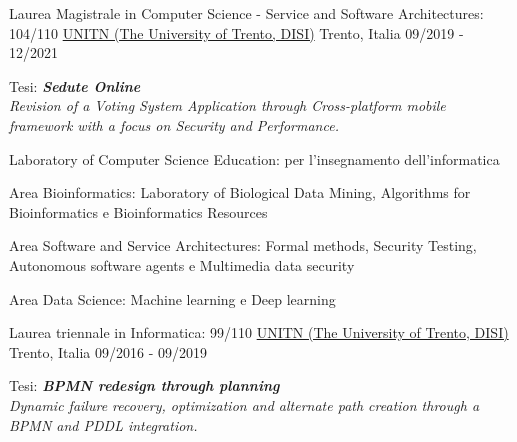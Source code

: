 

\begin{cventries}

\cventry
{Laurea Magistrale in Computer Science - Service and Software Architectures: 104/110} %
{\href{https://www.unitn.it/}{UNITN (The University of Trento, DISI)}}  %
{Trento, Italia} %
{09/2019 - 12/2021} %
{
  \begin{cvitems} %
    \item {Tesi: \textbf{\textit{Sedute Online}}\\\textit{Revision of a Voting System Application through Cross-platform mobile framework with a focus on Security and Performance.}}
    \item {Laboratory of Computer Science Education: per l'insegnamento dell'informatica}
    \item {Area Bioinformatics: Laboratory of Biological Data Mining, Algorithms for Bioinformatics e Bioinformatics Resources}
    \item {Area Software and Service Architectures: Formal methods, Security Testing, Autonomous software agents e Multimedia data security}
    \item {Area Data Science: Machine learning e Deep learning}
  \end{cvitems}
}

\cventry
{Laurea triennale in Informatica: 99/110} %
{\href{https://www.unitn.it/}{UNITN (The University of Trento, DISI)}}  %
{Trento, Italia} %
{09/2016 - 09/2019} %
{
  \begin{cvitems} %
    \item {Tesi: \textbf{\textit{BPMN redesign through planning}} \\\textit{Dynamic failure recovery, optimization and alternate path creation through a BPMN and PDDL integration.}}
  \end{cvitems}
}

\end{cventries}
